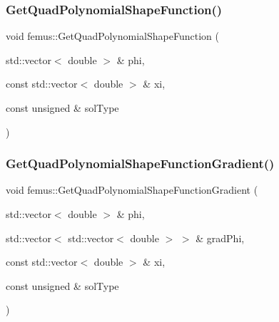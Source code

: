 \subsubsection{\texorpdfstring{Get\+Quad\+Polynomial\+Shape\+Function()}{GetQuadPolynomialShapeFunction()}}
{\footnotesize\ttfamily void femus\+::\+Get\+Quad\+Polynomial\+Shape\+Function (\begin{DoxyParamCaption}\item[{std\+::vector$<$ double $>$ \&}]{phi,  }\item[{const std\+::vector$<$ double $>$ \&}]{xi,  }\item[{const unsigned \&}]{sol\+Type }\end{DoxyParamCaption})}

\mbox{\label{namespacefemus_a580971c4603abf2e862f38425291afdf}} 
\subsubsection{\texorpdfstring{Get\+Quad\+Polynomial\+Shape\+Function\+Gradient()}{GetQuadPolynomialShapeFunctionGradient()}}
{\footnotesize\ttfamily void femus\+::\+Get\+Quad\+Polynomial\+Shape\+Function\+Gradient (\begin{DoxyParamCaption}\item[{std\+::vector$<$ double $>$ \&}]{phi,  }\item[{std\+::vector$<$ std\+::vector$<$ double $>$ $>$ \&}]{grad\+Phi,  }\item[{const std\+::vector$<$ double $>$ \&}]{xi,  }\item[{const unsigned \&}]{sol\+Type }\end{DoxyParamCaption})}

\mbox{\label{namespacefemus_a94873c1c0c41bf06892b4b1c8208d34e}} 
